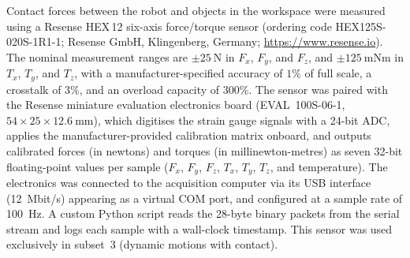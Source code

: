 \documentclass[14pt, a4paper]{article}
\begin{document}
Contact forces between the robot and objects in the workspace were measured using a
Resense HEX\,12 six-axis force/torque sensor (ordering code HEX125S-020S-1R1-1; Resense GmbH, Klingenberg, Germany; \url{https://www.resense.io}).
The nominal measurement ranges are $\pm\SI{25}{\newton}$ in $F_x$, $F_y$, and $F_z$, and $\pm\SI{125}{\milli\newton\meter}$ in $T_x$, $T_y$, and $T_z$, with a manufacturer-specified accuracy of $1\%$ of full scale, a crosstalk of $3\%$, and an overload capacity of $300\%$.
The sensor was paired with the Resense miniature evaluation electronics board (EVAL~100S-06-1, $54 \times 25 \times \SI{12.6}{\milli\meter}$), which digitises the strain gauge signals with a 24-bit ADC,
applies the manufacturer-provided calibration matrix onboard, and outputs calibrated forces (in newtons) and torques (in millinewton-metres) as seven 32-bit floating-point values per sample ($F_x$, $F_y$, $F_z$, $T_x$, $T_y$, $T_z$, and temperature).
The electronics was connected to the acquisition computer via its USB interface (\SI{12}{Mbit/s}) appearing as a virtual COM port, and configured at a sample rate of \SI{100}{\hertz}.
A custom Python script reads the 28-byte binary packets from the serial stream
and logs each sample with a wall-clock timestamp.
This sensor was used exclusively in subset~3 (dynamic motions with contact).
\end{document}
